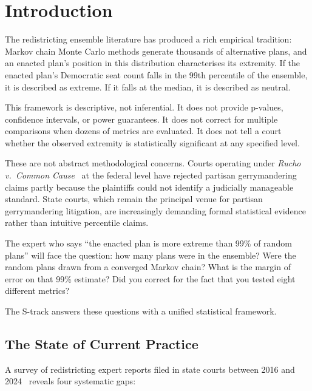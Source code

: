 \section{Introduction}
\label{sec:introduction}

The redistricting ensemble literature has produced a rich empirical
tradition: Markov chain Monte Carlo methods generate thousands of
alternative plans, and an enacted plan's position in this distribution
characterises its extremity.
If the enacted plan's Democratic seat count falls in the 99th percentile
of the ensemble, it is described as extreme.
If it falls at the median, it is described as neutral.

This framework is descriptive, not inferential.
It does not provide p-values, confidence intervals, or power guarantees.
It does not correct for multiple comparisons when dozens of metrics are
evaluated.
It does not tell a court whether the observed extremity is statistically
significant at any specified level.

These are not abstract methodological concerns.
Courts operating under \textit{Rucho v.\ Common Cause}~\citep{rucho2019}
at the federal level have rejected partisan gerrymandering claims partly
because the plaintiffs could not identify a judicially manageable standard.
State courts, which remain the principal venue for partisan gerrymandering
litigation, are increasingly demanding formal statistical evidence rather
than intuitive percentile claims.

The expert who says ``the enacted plan is more extreme than 99\% of random
plans'' will face the question: how many plans were in the ensemble?
Were the random plans drawn from a converged Markov chain?
What is the margin of error on that 99\% estimate?
Did you correct for the fact that you tested eight different metrics?

The S-track answers these questions with a unified statistical framework.

\subsection{The State of Current Practice}

A survey of redistricting expert reports filed in state courts between
2016 and 2024~\citep{chen2013unintentional,herschlag2020quantifying}
reveals four systematic gaps:

